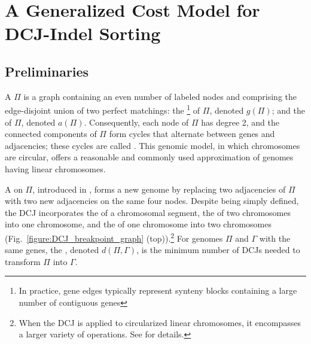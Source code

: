 \chapter{A Generalized Cost Model for DCJ-Indel Sorting}


\section{Preliminaries}
A  $\Pi$ is a graph containing an even number of labeled nodes and comprising the edge-disjoint union of two perfect matchings: the \footnote{In practice, gene edges typically represent synteny blocks containing a large number of contiguous genes} of $\Pi$, denoted $g(\Pi)$; and the  of $\Pi$, denoted $a(\Pi)$.  Consequently, each node of $\Pi$ has degree 2, and the connected components of $\Pi$ form cycles that alternate between genes and adjacencies; these cycles are called .  This genomic model, in which chromosomes are circular, offers a reasonable and commonly used approximation of genomes having linear chromosomes.

A  on $\Pi$, introduced in \cite{yancopoulos}, forms a new genome by replacing two adjacencies of $\Pi$ with two new adjacencies on the same four nodes.  Despite being simply defined, the DCJ incorporates the  of a chromosomal segment, the  of two chromosomes into one chromosome, and the  of one chromosome into two chromosomes (Fig.~\ref{figure:DCJ_breakpoint_graph} (top)).\footnote{When the DCJ is applied to circularized linear chromosomes, it encompasses a larger variety of operations. See \cite{braga2010} for details.}  For genomes $\Pi$ and $\Gamma$ with the same genes, the , denoted $d(\Pi, \Gamma)$, is the minimum number of DCJs needed to transform $\Pi$ into $\Gamma$.

